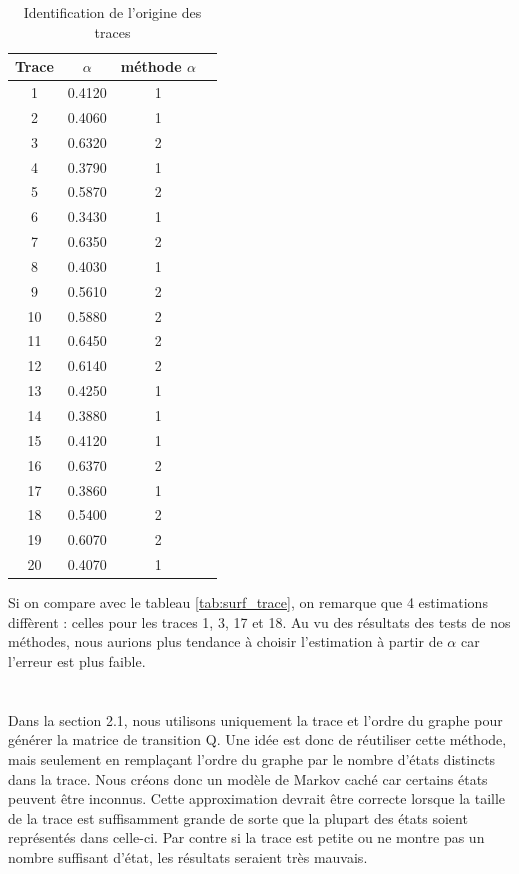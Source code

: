 \documentclass[a4paper,titlepage]{report}
\begin{document}
                             
\begin{table}[h]
	\center
	\begin{tabular}{c|cc|c}
		Trace & $\alpha$ & méthode $\alpha$\\
		\hline
		1 & 0.4120 &  1  \\
		2 & 0.4060 & 1 \\
		3 & 0.6320 & 2 \\ 
		4 & 0.3790 & 1 \\
		5 & 0.5870 & 2 \\
		6 & 0.3430 & 1 \\
		7 & 0.6350 & 2 \\
		8 & 0.4030 & 1 \\
		9 & 0.5610 & 2 \\
		10 & 0.5880 & 2 \\
		11 & 0.6450 & 2 \\
		12 & 0.6140 & 2 \\
		13 & 0.4250 & 1 \\
		14 & 0.3880 & 1 \\
		15 & 0.4120 & 1 \\
		16 & 0.6370 & 2 \\
		17 & 0.3860 & 1 \\
		18 & 0.5400 & 2 \\
		19 & 0.6070 & 2 \\
		20 & 0.4070 & 1 \\
	\end{tabular}
	\caption{Identification de l'origine des traces}
\end{table}

 Si on compare avec le tableau \ref{tab:surf_trace}, on remarque que 4 estimations diffèrent : celles pour les traces 1, 3, 17 et 18. Au vu des résultats des tests de nos méthodes, nous aurions plus tendance à choisir l'estimation à partir de $\alpha$ car l'erreur est plus faible.
 
\section{}
Dans la section 2.1, nous utilisons uniquement la trace et l'ordre du graphe pour générer la matrice de transition Q. Une idée est donc de réutiliser cette méthode, mais seulement en remplaçant l'ordre du graphe par le nombre d'états distincts dans la trace. Nous créons donc un modèle de Markov caché car certains états peuvent être inconnus. Cette approximation devrait être correcte lorsque la taille de la trace est suffisamment grande de sorte que la plupart des états soient représentés dans celle-ci. Par contre si la trace est petite ou ne montre pas un nombre suffisant d'état, les résultats seraient très mauvais.
\end{document}
